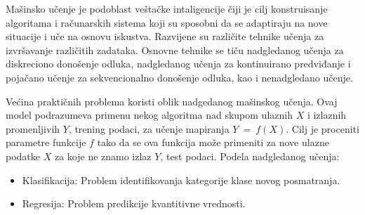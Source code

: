 
\ifpdf
    \graphicspath{{Chapter1/Figs/Raster/}{Chapter1/Figs/PDF/}{Chapter1/Figs/}}
\else
    \graphicspath{{Chapter1/Figs/Vector/}{Chapter1/Figs/}}
\fi



Mašinsko učenje je podoblast veštačke intaligencije čiji je cilj konstruisanje
algoritama i računarskih sistema koji su sposobni da se adaptiraju na nove
situacije i uče na osnovu iskustva. Razvijene su različite tehnike učenja za
izvršavanje različitih zadataka. Osnovne tehnike se tiču nadgledanog učenja za
diskreciono donošenje odluka, nadgledanog učenja za kontinuirano predviđanje i
pojačano učenje za sekvencionalno donošenje odluka, kao i nenadgledano učenje.


Većina praktičnih problema koristi oblik nadgedanog mašinskog učenja.
Ovaj model podrazumeva primenu nekog algoritma nad skupom ulaznih $X$ i
izlaznih promenljivih $Y$, trening podaci, za učenje mapiranja $Y \ = \ f(X)$.
Cilj je proceniti parametre funkcije $f$ tako da se ova funkcija može primeniti
za nove ulazne podatke $X$ za koje ne znamo izlaz $Y$, test podaci. Podela
nadgledanog učenja:
\begin{itemize}
  \item Klasifikacija: Problem identifikovanja kategorije klase novog
  posmatranja.
  \item Regresija: Problem predikcije kvantitivne vrednosti.
\end{itemize}

